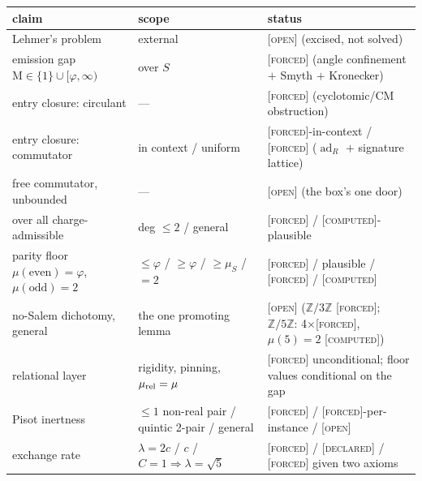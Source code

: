 \documentclass[11pt]{article}
\newcommand{\tagF}{\textcolor{cF}{\textsc{[forced]}}}
\newcommand{\tagD}{\textcolor{cD}{\textsc{[declared]}}}
\newcommand{\tagC}{\textcolor{cC}{\textsc{[computed]}}}
\newcommand{\tagO}{\textcolor{cO}{\textsc{[open]}}}
\newcommand{\Z}{\mathbb{Z}}
\newcommand{\gp}{\varphi}
\newcommand{\M}{\mathrm{M}}
\newcommand{\adR}{\operatorname{ad}_R}
\theoremstyle{plain}
\theoremstyle{definition}
\theoremstyle{remark}
\begin{document}
{\small
\begin{center}
\setlength{\tabcolsep}{4pt}\begin{tabular}{@{}p{4.6cm}p{4.4cm}p{6.4cm}@{}}
\toprule
claim & scope & status\\
\midrule
Lehmer's problem & external & \tagO{} (excised, not solved)\\
emission gap $\M\in\{1\}\cup[\gp,\infty)$ & over $S$ & \tagF{} (angle confinement $+$ Smyth $+$ Kronecker)\\
\quad entry closure: circulant & --- & \tagF{} (cyclotomic/CM obstruction)\\
\quad entry closure: commutator & in context / uniform & \tagF{}-in-context / \tagF{} ($\adR$ $+$ signature lattice)\\
\quad free commutator, unbounded & --- & \tagO{} (the box's one door)\\
\quad over all charge-admissible & deg $\le2$ / general & \tagF{} / \tagC{}-plausible\\
parity floor $\mu(\text{even}){=}\gp$, $\mu(\text{odd}){=}2$ & $\le\gp$ / $\ge\gp$ / $\ge\mu_S$ / $=2$ & \tagF{} / plausible / \tagF{} / \tagC{}\\
no-Salem dichotomy, general & the one promoting lemma & \tagO{} ($\Z/3\Z$ \tagF{}; $\Z/5\Z$: 4$\times$\tagF{}, $\mu(5){=}2$ \tagC{})\\
relational layer & rigidity, pinning, $\mu_{\rm rel}=\mu$ & \tagF{} unconditional; floor values conditional on the gap\\
Pisot inertness & $\le1$ non-real pair / quintic 2-pair / general & \tagF{} / \tagF{}-per-instance / \tagO{}\\
exchange rate & $\lambda=2c$ / $c$ / $C{=}1\Rightarrow\lambda{=}\sqrt5$ & \tagF{} / \tagD{} / \tagF{} given two axioms\\
\bottomrule
\end{tabular}
\end{center}
}
\end{document}
